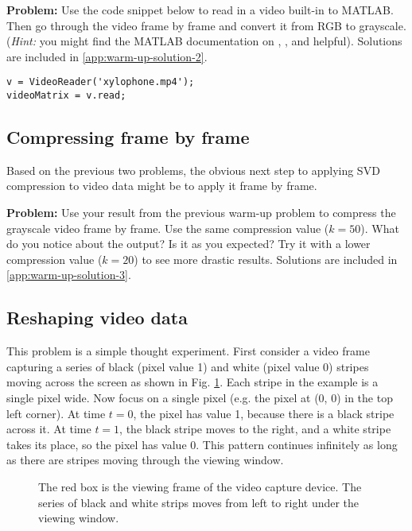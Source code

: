 \textbf{Problem:} Use the code snippet below to read in a video built-in to MATLAB. Then go through the video frame by frame and convert it from RGB to grayscale. (\textit{Hint:} you might find the MATLAB documentation on , , and  helpful). Solutions are included in \ref{app:warm-up-solution-2}.
\begin{lstlisting}[style=code]
v = VideoReader('xylophone.mp4');
videoMatrix = v.read;
\end{lstlisting}

\subsection{Compressing frame by frame}
Based on the previous two problems, the obvious next step to applying SVD compression to video data might be to apply it frame by frame.

\textbf{Problem:} Use your result from the previous warm-up problem to compress the grayscale video frame by frame. Use the same compression value ($k = 50$). What do you notice about the output? Is it as you expected? Try it with a lower compression value ($k = 20$) to see more drastic results. Solutions are included in \ref{app:warm-up-solution-3}.

\subsection{Reshaping video data}
This problem is a simple thought experiment. First consider a video frame capturing a series of black (pixel value 1) and white (pixel value 0) stripes moving across the screen as shown in Fig. \ref{fig:warm-up-4-experiment-1}. Each stripe in the example is a single pixel wide. Now focus on a single pixel (e.g. the pixel at (0, 0) in the top left corner). At time $t = 0$, the pixel has value 1, because there is a black stripe across it. At time $t = 1$, the black stripe moves to the right, and a white stripe takes its place, so the pixel has value 0. This pattern continues infinitely as long as there are stripes moving through the viewing window.
\begin{figure}[ht]
	\centering
	\caption{The red box is the viewing frame of the video capture device. The series of black and white strips moves from left to right under the viewing window.}
	\label{fig:warm-up-4-experiment-1}
\end{figure}

